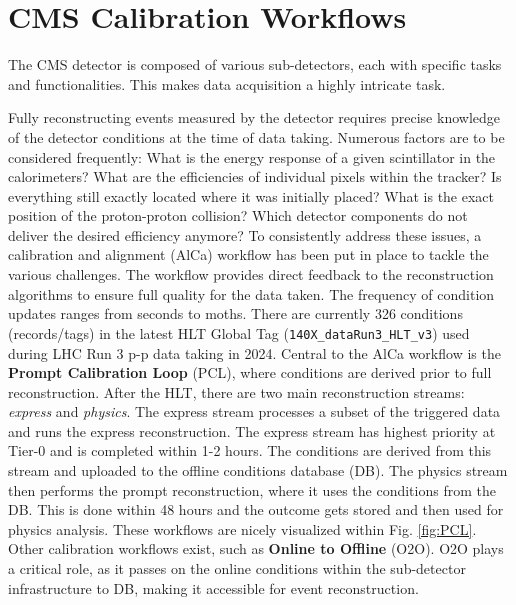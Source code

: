 \section{CMS Calibration Workflows}
The CMS detector is composed of various sub-detectors, each with specific tasks and functionalities. This makes data acquisition a highly intricate task.

Fully reconstructing events measured by the detector requires precise knowledge of the detector conditions at the time of data taking. Numerous factors are to be considered frequently: What is the energy response of a given scintillator in the calorimeters? What are the efficiencies of individual pixels within the tracker? Is everything still exactly located where it was initially placed? What is the exact position of the proton-proton collision? Which detector components do not deliver the desired efficiency anymore? To consistently address these issues, a calibration and alignment (AlCa) workflow has been put in place to tackle the various challenges. The workflow provides direct feedback to the reconstruction algorithms to ensure full quality for the data taken. The frequency of condition updates ranges from seconds to moths. There are currently 326 conditions (records/tags) in the latest HLT Global Tag (\texttt{140X\_dataRun3\_HLT\_v3}) used during LHC Run 3 p-p data taking in 2024. 
\newline \newline
Central to the AlCa workflow is the \textbf{Prompt Calibration Loop} (PCL), where conditions are derived prior to full reconstruction. After the HLT, there are two main reconstruction streams: \textit{express} and \textit{physics}. The express stream processes a subset of the triggered data and runs the express reconstruction. The express stream has highest priority at Tier-0 and is completed within 1-2 hours. The conditions are derived from this stream and uploaded to the offline conditions database (DB). The physics stream then performs the prompt reconstruction, where it uses the conditions from the DB. This is done within 48 hours and the outcome gets stored and then used for physics analysis. These workflows are nicely visualized within Fig. \ref{fig:PCL}. Other calibration workflows exist, such as \textbf{Online to Offline} (O2O). O2O plays a critical role, as it passes on the online conditions within the sub-detector infrastructure to DB, making it accessible for event reconstruction.
\newline \newline

